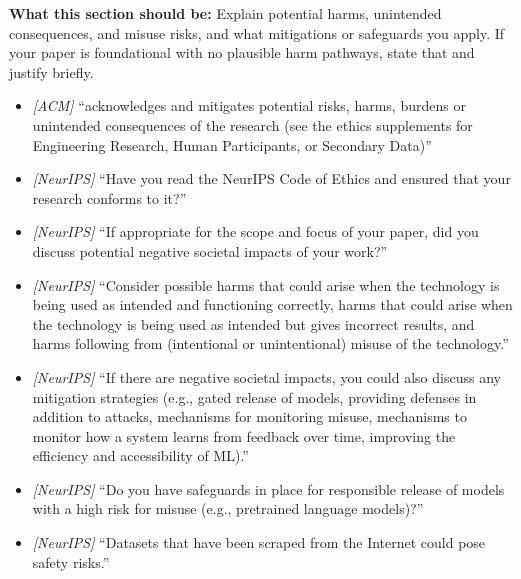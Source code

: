 \noindent\textbf{What this section should be:}
Explain potential harms, unintended consequences, and misuse risks, and what mitigations or safeguards you apply. If your paper is foundational with no plausible harm pathways, state that and justify briefly.
\begin{itemize}
  \item \textit{[ACM]} ``acknowledges and mitigates potential risks, harms, burdens or unintended consequences of the research (see the ethics supplements for Engineering Research, Human Participants, or Secondary Data)''
  \item \textit{[NeurIPS]} ``Have you read the NeurIPS Code of Ethics and ensured that your research conforms to it?''
  \item \textit{[NeurIPS]} ``If appropriate for the scope and focus of your paper, did you discuss potential negative societal impacts of your work?''
  \item \textit{[NeurIPS]} ``Consider possible harms that could arise when the technology is being used as intended and functioning correctly, harms that could arise when the technology is being used as intended but gives incorrect results, and harms following from (intentional or unintentional) misuse of the technology.''
  \item \textit{[NeurIPS]} ``If there are negative societal impacts, you could also discuss any mitigation strategies (e.g., gated release of models, providing defenses in addition to attacks, mechanisms for monitoring misuse, mechanisms to monitor how a system learns from feedback over time, improving the efficiency and accessibility of ML).''
  \item \textit{[NeurIPS]} ``Do you have safeguards in place for responsible release of models with a high risk for misuse (e.g., pretrained language models)?''
  \item \textit{[NeurIPS]} ``Datasets that have been scraped from the Internet could pose safety risks.''
\end{itemize}